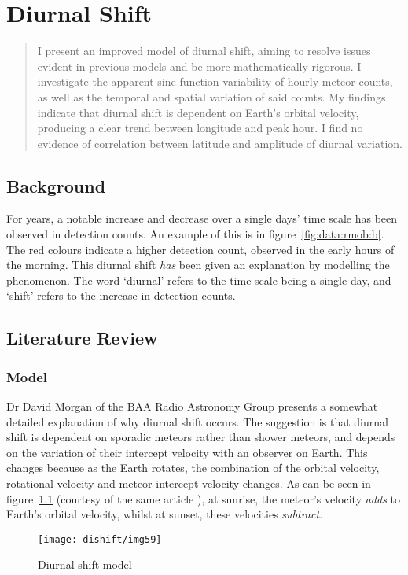 \chapter{Diurnal Shift}
\label{chap:diurnalshift}
\begin{strip}
	\begin{minipage}{\textwidth}
		\begin{abstract}
			I present an improved model of diurnal shift, aiming to resolve issues evident in previous models and be more mathematically rigorous. I investigate the apparent sine-function variability of hourly meteor counts, as well as the temporal and spatial variation of said counts. My findings indicate that diurnal shift is dependent on Earth's orbital velocity, producing a clear trend between longitude and peak hour. I find no evidence of correlation between latitude and amplitude of diurnal variation.
		\end{abstract}
	\end{minipage}
\end{strip}
\section{Background}
For years, a notable increase and decrease over a single days' time scale has been observed in detection counts. An example of this is in figure~\ref{fig:data:rmob:b}. The red colours indicate a higher detection count, observed in the early hours of the morning. This diurnal shift {\it has} been given an explanation by modelling the phenomenon. The word `diurnal' refers to the time scale being a single day, and `shift' refers to the increase in detection counts. 
\section{Literature Review}
\subsection{Model}
Dr David Morgan of the BAA Radio Astronomy Group presents a somewhat detailed explanation \cite{baa} of why diurnal shift occurs. The suggestion is that diurnal shift is dependent on sporadic meteors rather than shower meteors, and depends on the variation of their intercept velocity with an observer on Earth. This changes because as the Earth rotates, the combination of the orbital velocity, rotational velocity and meteor intercept velocity changes. As can be seen in figure~\ref{fig:dishift:model} (courtesy of the same article \cite{baa}), at sunrise, the meteor's velocity {\it adds} to Earth's orbital velocity, whilst at sunset, these velocities {\it subtract}. 
\begin{figure}[h!]
	\centering
	\texttt{[image: dishift/img59]}
	\caption{Diurnal shift model
		\label{fig:dishift:model}}
\end{figure}

